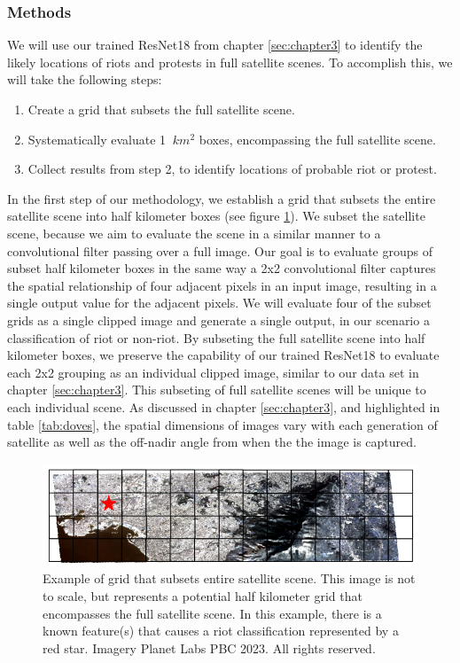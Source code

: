 \subsubsection{Methods}
We will use our trained ResNet18 from chapter \ref{sec:chapter3} to identify the likely locations of riots and protests in full satellite scenes.  To accomplish this, we will take the following steps:
\begin{enumerate}
\item Create a grid that subsets the full satellite scene.
\item Systematically evaluate 1 $\ km^{2}$ boxes, encompassing the full satellite scene.
\item Collect results from step 2, to identify locations of probable riot or protest.
\end{enumerate}
In the first step of our methodology, we establish a grid that subsets the entire satellite scene into half kilometer boxes (see figure \ref{fig:grid_paper3}).  We subset the satellite scene, because we aim to evaluate the scene in a similar manner to a convolutional filter passing over a full image.  Our goal is to evaluate groups of subset half kilometer boxes in the same way a 2x2 convolutional filter captures the spatial relationship of four adjacent pixels in an input image, resulting in a single output value for the adjacent pixels.  We will evaluate four of the subset grids as a single clipped image and generate a single output, in our scenario a classification of riot or non-riot.  By subseting the full satellite scene into half kilometer boxes, we preserve the capability of our trained ResNet18 to evaluate each 2x2 grouping as an individual clipped image, similar to our data set in chapter \ref{sec:chapter3}.  This subseting of full satellite scenes will be unique to each individual scene.  As discussed in chapter \ref{sec:chapter3}, and highlighted in table \ref{tab:doves}, the spatial dimensions of images vary with each generation of satellite as well as the off-nadir angle from when the the image is captured.

\begin{figure}
    \centering
    \includegraphics[width=0.75\linewidth]{Figures/grided_satimage.png}
    \caption{Example of grid that subsets entire satellite scene.  This image is not to scale, but represents a potential half kilometer grid that encompasses the full satellite scene.  In this example, there is a known feature(s) that causes a riot classification represented by a red star.  Imagery \textcopyright Planet Labs PBC 2023. All rights reserved.}
    \label{fig:grid_paper3}
\end{figure}

